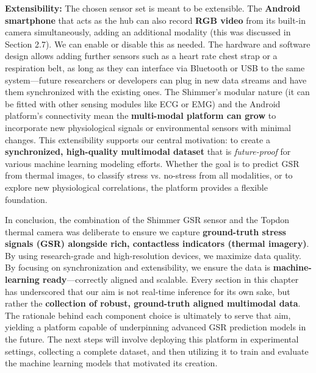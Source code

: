 \documentclass[11pt,a4paper]{report}
\begin{document}
\textbf{Extensibility:} The chosen sensor set is meant to be extensible. The \textbf{Android smartphone} that acts as the hub can also record \textbf{RGB video} from its built-in camera simultaneously, adding an additional modality (this was discussed in Section 2.7). We can enable or disable this as needed. The hardware and software design allows adding further sensors such as a heart rate chest strap or a respiration belt, as long as they can interface via Bluetooth or USB to the same system—future researchers or developers can plug in new data streams and have them synchronized with the existing ones. The Shimmer's modular nature (it can be fitted with other sensing modules like ECG or EMG) and the Android platform's connectivity mean the \textbf{multi-modal platform can grow} to incorporate new physiological signals or environmental sensors with minimal changes. This extensibility supports our central motivation: to create a \textbf{synchronized, high-quality multimodal dataset} that is \textit{future-proof} for various machine learning modeling efforts. Whether the goal is to predict GSR from thermal images, to classify stress vs. no-stress from all modalities, or to explore new physiological correlations, the platform provides a flexible foundation.

In conclusion, the combination of the Shimmer GSR sensor and the Topdon thermal camera was deliberate to ensure we capture \textbf{ground-truth stress signals (GSR) alongside rich, contactless indicators (thermal imagery)}. By using research-grade and high-resolution devices, we maximize data quality. By focusing on synchronization and extensibility, we ensure the data is \textbf{machine-learning ready}—correctly aligned and scalable. Every section in this chapter has underscored that our aim is not real-time inference for its own sake, but rather the \textbf{collection of robust, ground-truth aligned multimodal data}. The rationale behind each component choice is ultimately to serve that aim, yielding a platform capable of underpinning advanced GSR prediction models in the future. The next steps will involve deploying this platform in experimental settings, collecting a complete dataset, and then utilizing it to train and evaluate the machine learning models that motivated its creation.



\end{document}
